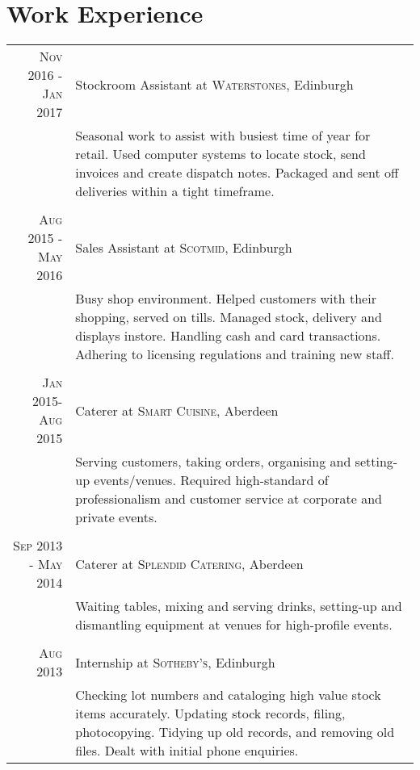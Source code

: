 \documentclass[12pt, a4paper]{article}
\begin{document}
\section{Work Experience}
\setlength\tabcolsep{4pt}\centering
\begin{tabular}{r|p{11cm}}
\textsc{Nov 2016 - Jan 2017} & Stockroom Assistant at \textsc{Waterstones}, Edinburgh \\
& \small{Seasonal work to assist with busiest time of year for retail. Used computer systems to locate stock, send invoices and create dispatch notes. Packaged and sent off deliveries within a tight timeframe.} \\
\multicolumn{2}{c}{} \\
\textsc{Aug 2015 - May 2016} & Sales Assistant at \textsc{Scotmid}, Edinburgh \\
& \small{Busy shop environment. Helped customers with their shopping, served on tills. Managed stock, delivery and displays instore. Handling cash and card transactions. Adhering to licensing regulations and training new staff.} \\
\multicolumn{2}{c}{} \\
\textsc{Jan 2015-Aug 2015} & Caterer at \textsc{Smart Cuisine}, Aberdeen \emph{}\\
& \small{Serving customers, taking orders, organising and setting-up events/venues. Required high-standard of professionalism and customer service at corporate and private events.}\\
\multicolumn{2}{c}{} \\
\textsc{Sep 2013 - May 2014} & Caterer at \textsc{Splendid Catering}, Aberdeen \emph{}\\
& \small{Waiting tables, mixing and serving drinks, setting-up and dismantling equipment at venues for high-profile events.}\\
\multicolumn{2}{c}{} \\
\textsc{Aug 2013} & Internship at \textsc{Sotheby's}, Edinburgh \emph{}\\
& \small{Checking lot numbers and cataloging high value stock items accurately. Updating stock records, filing, photocopying. Tidying up old records, and removing old files. Dealt with initial phone enquiries.}\\
\end{tabular}
\end{document}
